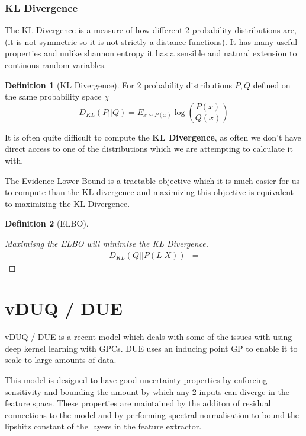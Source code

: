 \documentclass[12pt, a4paper]{report}
\theoremstyle{definition}
\newtheorem{definition}{Definition}[section]
\newtheorem{proof}{Proof}[section]
\begin{document}
\subsection{KL Divergence}

The KL Divergence is a measure of how different 2 probability distributions are, (it is not symmetric so it is not strictly a distance functions). It has many useful properties and unlike shannon entropy it has a sensible and natural extension to continous random variables.

\begin{definition}[KL Divergence]
    For 2 probability distributions $P, Q$ defined on the same probability space $\chi$
    $$D_{KL} \left( P || Q \right) = E_{x \sim P(x)}  \log \left( \frac{P(x)}{Q(x)}\right)$$
\end{definition}



It is often quite difficult to compute the \textbf{KL Divergence}, as often we don't have direct access to one of the distributions which we are attempting to calculate it with.

The Evidence Lower Bound is a tractable objective which it is much easier for us to compute than the KL divergence and maximizing this objective is equivalent to maximizing the KL Divergence.

\begin{definition}[ELBO]
    
\end{definition}


\begin{proof}[Maximisng the ELBO will minimise the KL Divergence]
    \begin{align*}
        D_{KL} \left( Q || P \left(L | X\right) \right) &= 
    \end{align*}
\end{proof}


\chapter{vDUQ / DUE}

vDUQ / DUE \cite{vanamersfoort2020uncertainty} is a recent model which deals with some of the issues with using deep kernel learning with GPCs. DUE uses an inducing point GP to enable it to scale to large amounts of data.

This model is designed to have good uncertainty properties by enforcing sensitivity and bounding the amount by which any 2 inputs can diverge in the feature space. These properties are maintained by the additon of residual connections to the model and by performing spectral normalisation to bound the lipshitz constant of the layers in the feature extractor.
\end{document}
